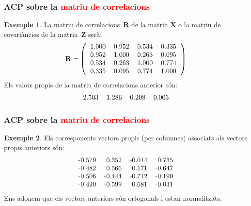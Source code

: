 \documentclass[12pt,t]{beamer}
\newcommand{\red}[1]{\textcolor{red}{#1}}
\theoremstyle{plain}
\theoremstyle{definition}
\newtheorem{exemple}{Exemple}
\begin{document}
\begin{frame}
\frametitle{ACP sobre la \red{matriu de correlacions}}
\begin{exemple}
La matriu de correlacions~$\mathbf{R}$ de la matriu $\mathbf{X}$ o la matriu de covariàncies de la matriu~$\mathbf{Z}$ serà:
\[
{\mathbf{R}}=\left(
\begin{tabular}{rrrr}
  1.000 & 0.952 & 0.534 & 0.335 \\ 
  0.952 & 1.000 & 0.263 & 0.095 \\ 
  0.534 & 0.263 & 1.000 & 0.774 \\ 
  0.335 & 0.095 & 0.774 & 1.000 \\ 
  \end{tabular}\right)
\]
Els valors propis de la matriu de correlacions anterior són:
\[
\begin{tabular}{rrrr}
  2.503 & 1.286 & 0.208 & 0.003 \\ 
  \end{tabular}\]

\end{exemple}
\end{frame}


\begin{frame}
\frametitle{ACP sobre la \red{matriu de correlacions}}
\begin{exemple}
Els corresponents vectors propis (per columnes) associats als vectors propis anteriors són:
\[
\begin{tabular}{rrrr}
  -0.579 & 0.352 & -0.014 & 0.735 \\ 
  -0.482 & 0.566 & 0.171 & -0.647 \\ 
  -0.506 & -0.444 & -0.712 & -0.199 \\ 
  -0.420 & -0.599 & 0.681 & -0.031 \\ 
  \end{tabular}\]
Ens adonem que els vectors anteriors són ortogonals i estan normalitzats.


\end{exemple}
\end{frame}
\end{document}
